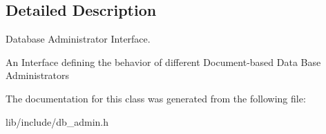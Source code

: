 \subsection{Detailed Description}
Database Administrator Interface. 

An Interface defining the behavior of different Document-\/based Data Base Administrators 

The documentation for this class was generated from the following file\-:\begin{DoxyCompactItemize}
\item 
lib/include/db\-\_\-admin.\-h\end{DoxyCompactItemize}
